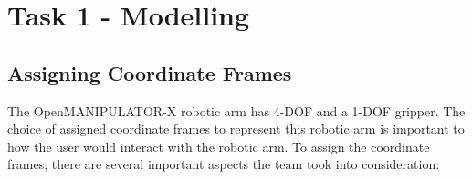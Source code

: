 \documentclass[10pt, a4paper]{article}
\begin{document}
\section{Task 1 - Modelling}

\subsection{Assigning Coordinate Frames}

The OpenMANIPULATOR-X robotic arm has 4-DOF and a 1-DOF gripper. The choice of
assigned coordinate frames to represent this robotic arm is important to how the
user would interact with the robotic arm. To assign the coordinate frames, there are several
important aspects the team took into consideration:
\end{document}
